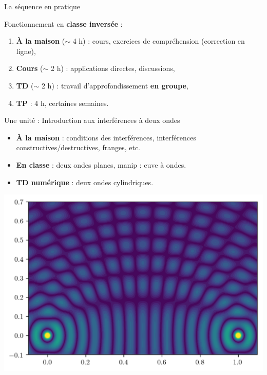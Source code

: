 \begin{frame}{La séquence en pratique}
\begin{block}{Fonctionnement en \textbf{classe inversée} :}
\begin{enumerate}
	\item \textbf{À la maison} ($\sim$ 4 h) : cours, exercices de compréhension (correction en ligne),
	\item \textbf{Cours} ($\sim$ 2 h) : applications directes, discussions,
	\item \textbf{TD} ($\sim$ 2 h) : travail d'approfondissement \textbf{en groupe},
	\item \textbf{TP} : 4 h, certaines semaines.
\end{enumerate}
\end{block}
\end{frame}

\begin{frame}{Une unité : Introduction aux interférences à deux ondes}
\begin{itemize}
	\item \textbf{À la maison} : conditions des interférences, interférences constructives/destructives, franges, etc.
	\item \textbf{En classe} : deux ondes planes, manip : cuve à ondes.
	\item \textbf{TD numérique} : deux ondes cylindriques.
\end{itemize}
\centering
\includegraphics[width=0.4\columnwidth]{img/3_projet_enseignement/interf_cylindriques}
\end{frame}


